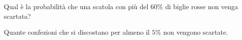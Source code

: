 \documentclass[11pt,openany]{book}
\newcommand{\mylabel}[1]{{\footnotesize\textsf{#1}}\hfill}
\renewenvironment{itemize}
  {\begin{list}{$\triangleright$}{%
   \setlength{\parskip}{0mm}
   \setlength{\topsep}{.2\baselineskip}
   \setlength{\rightmargin}{0mm}
   \setlength{\listparindent}{0mm}
   \setlength{\itemindent}{0mm}
   \setlength{\labelwidth}{3ex}
   \setlength{\itemsep}{.4\baselineskip}
   \setlength{\parsep}{0mm}
   \setlength{\partopsep}{0mm}
   \setlength{\labelsep}{1ex}
   \setlength{\leftmargin}{\labelwidth+\labelsep}
   \let\makelabel\mylabel}}{%
   \end{list}\vspace*{-1.3mm}}
\begin{document}
Qual è la probabilità che una scatola con più del $60\%$ di biglie rosse non venga scartata?

Quante confezioni che si discostano per almeno il $5\%$ non vengono scartate.

\end{document}
